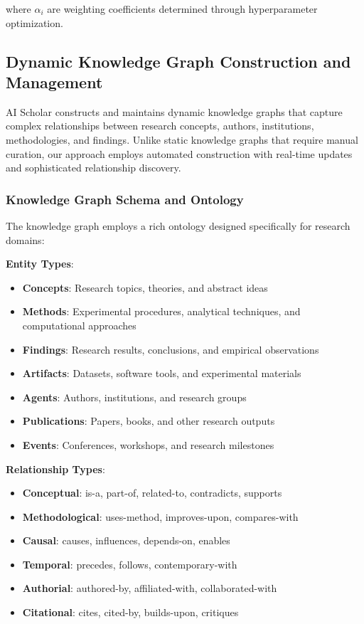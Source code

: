 \documentclass[10pt,twocolumn]{article}
\begin{document}
where $\alpha_i$ are weighting coefficients determined through hyperparameter optimization.

\subsection{Dynamic Knowledge Graph Construction and Management}

AI Scholar constructs and maintains dynamic knowledge graphs that capture complex relationships between research concepts, authors, institutions, methodologies, and findings. Unlike static knowledge graphs that require manual curation, our approach employs automated construction with real-time updates and sophisticated relationship discovery.

\subsubsection{Knowledge Graph Schema and Ontology}

The knowledge graph employs a rich ontology designed specifically for research domains:

\textbf{Entity Types}:
\begin{itemize}
    \item \textbf{Concepts}: Research topics, theories, and abstract ideas
    \item \textbf{Methods}: Experimental procedures, analytical techniques, and computational approaches
    \item \textbf{Findings}: Research results, conclusions, and empirical observations
    \item \textbf{Artifacts}: Datasets, software tools, and experimental materials
    \item \textbf{Agents}: Authors, institutions, and research groups
    \item \textbf{Publications}: Papers, books, and other research outputs
    \item \textbf{Events}: Conferences, workshops, and research milestones
\end{itemize}

\textbf{Relationship Types}:
\begin{itemize}
    \item \textbf{Conceptual}: is-a, part-of, related-to, contradicts, supports
    \item \textbf{Methodological}: uses-method, improves-upon, compares-with
    \item \textbf{Causal}: causes, influences, depends-on, enables
    \item \textbf{Temporal}: precedes, follows, contemporary-with
    \item \textbf{Authorial}: authored-by, affiliated-with, collaborated-with
    \item \textbf{Citational}: cites, cited-by, builds-upon, critiques
\end{itemize}
\end{document}
